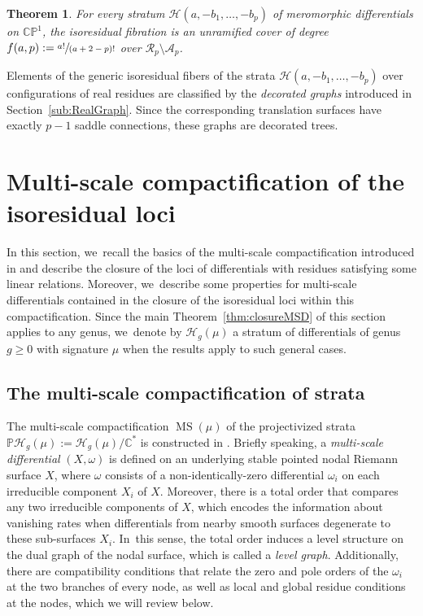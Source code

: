 \documentclass[11pt]{article}
\newcommand\PP{{\mathbb P}}
\DeclareMathOperator\MS{MS}
\newtheorem{thm}{Theorem}[section]
\theoremstyle{definition}
\begin{document}
\begin{thm}\label{thm:numerofibre}
For every stratum $\mathcal{H}(a,-b_{1},\dots,-b_{p})$ of meromorphic differentials on $\mathbb{CP}^{1}$, the isoresidual fibration is an unramified cover of degree $f(a,p):=\sfrac{a!}{(a+2-p)!}$ over $\mathcal{R}_{p} \setminus \mathcal{A}_{p}$.
\end{thm}

Elements of the generic isoresidual fibers of the strata $\mathcal{H}(a,-b_{1},\dots,-b_{p})$ over configurations of real residues are classified by the \textit{decorated graphs} introduced in Section~\ref{sub:RealGraph}. Since the corresponding translation surfaces have exactly $p-1$ saddle connections, these graphs are decorated trees.\enlargethispage{\baselineskip}

\section{Multi-scale compactification of the isoresidual loci}\label{sec:multi-scale}

In this section, we~recall the basics of the multi-scale compactification introduced in \cite{BCGGM3} and describe the closure of the loci of differentials with residues satisfying some linear relations. Moreover, we~describe some properties for multi-scale differentials contained in the closure of the isoresidual loci within this compactification. Since the main Theorem~\ref{thm:closureMSD} of this section applies to any genus, we~denote by $\mathcal H_{g}(\mu)$ a stratum of differentials of genus $g\geq0$ with signature $\mu$ when the results apply to such general cases.

\subsection{The multi-scale compactification of strata}\label{sub:multi-scale}

The multi-scale compactification $\MS(\mu)$ of the projectivized strata $\PP\mathcal H_{g}(\mu):= \mathcal H_{g}(\mu) / \mathbb C^*$ is constructed in \cite{BCGGM2}. Briefly speaking, a {\em multi-scale differential} $(X,\omega)$ is defined on an underlying stable pointed nodal Riemann surface $X$, where $\omega$ consists of a non-identically-zero differential $\omega_{i}$ on each irreducible component $X_{i}$ of $X$. Moreover, there is a total order that compares any two irreducible components of $X$, which encodes the information about vanishing rates when differentials from nearby smooth surfaces degenerate to these sub-surfaces $X_i$. In~this sense, the total order induces a level structure on the dual graph of the nodal surface, which is called a {\em level graph}. Additionally, there are compatibility conditions that relate the zero and pole orders of the $\omega_{i}$ at the two branches of every node, as well as local and global residue conditions at the nodes, which we will review below.
\end{document}
